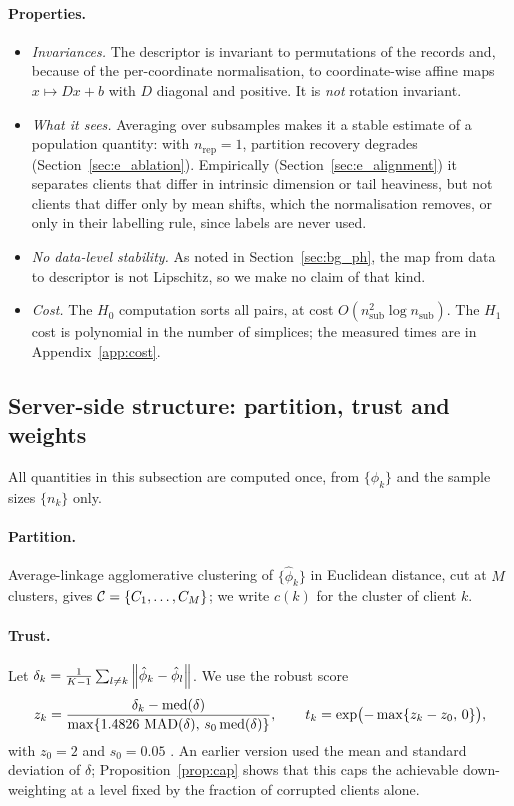 \paragraph{Properties.}
\begin{itemize}[leftmargin=1.2em,itemsep=2pt]
  \item \emph{Invariances.} The descriptor is invariant to permutations of the records and,
    because of the per-coordinate normalisation, to coordinate-wise affine maps
    $x\mapsto Dx+b$ with $D$ diagonal and positive. It is \emph{not} rotation invariant.
  \item \emph{What it sees.} Averaging over subsamples makes it a stable estimate of a
    population quantity: with $n_{\mathrm{rep}}=1$, partition recovery degrades
    (Section~\ref{sec:e_ablation}). Empirically (Section~\ref{sec:e_alignment}) it separates
    clients that differ in intrinsic dimension or tail heaviness, but not clients that
    differ only by mean shifts, which the normalisation removes, or only in their labelling
    rule, since labels are never used.
  \item \emph{No data-level stability.} As noted in Section~\ref{sec:bg_ph}, the map from
    data to descriptor is not Lipschitz, so we make no claim of that kind.
  \item \emph{Cost.} The $H_0$ computation sorts all pairs, at cost
    $O(n_{\mathrm{sub}}^2\log n_{\mathrm{sub}})$. The $H_1$ cost is polynomial in the
    number of simplices; the measured times are in Appendix~\ref{app:cost}.
\end{itemize}

\subsection{Server-side structure: partition, trust and weights}
\label{sec:structure}

All quantities in this subsection are computed once, from $\{\hat\phi_k\}$ and the sample
sizes $\{n_k\}$ only.

\paragraph{Partition.}
Average-linkage agglomerative clustering of $\{\hat\phi_k\}$ in Euclidean distance, cut at
$M$ clusters, gives $\mathcal{C}=\{C_1,\dots,C_M\}$; we write $c(k)$ for the cluster of client $k$.

\paragraph{Trust.}
Let $\delta_k=\frac{1}{K-1}\sum_{l\neq k}\left\lVert \hat\phi_k-\hat\phi_l \right\rVert$. We use the robust
score
\[
  z_k=\frac{\delta_k-\operatorname{med}(\delta)}{\max\{1.4826\,\operatorname{MAD}(\delta),\,s_0\operatorname{med}(\delta)\}},
  \qquad t_k=\exp\bigl(-\max\{z_k-z_0,\,0\}\bigr),
\]
with $z_0=2$ and $s_0=0.05$ \citep{huber2009robust}. An earlier version used the mean and
standard deviation of $\delta$; Proposition~\ref{prop:cap} shows that this caps the
achievable down-weighting at a level fixed by the fraction of corrupted clients alone.

